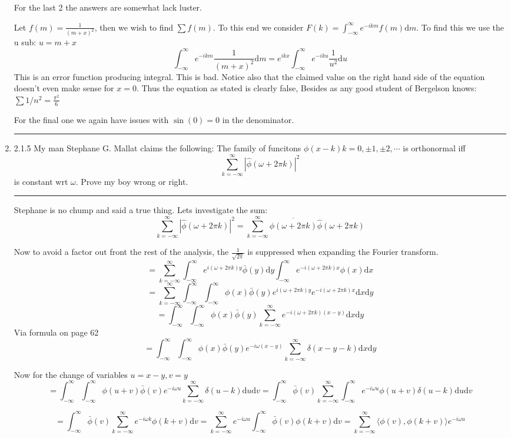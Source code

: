 \documentclass[12pt]{article}
\newcommand{\di}{\mathrm{d}}
\newcommand{\intinf}{\int_{-\infty}^\infty}
\newcommand{\suminf}[1]{\sum_{#1 = -\infty}^\infty}
\theoremstyle{definition}
\begin{document}
\begin{enumerate}
For the last 2 the answers are somewhat lack luster. 


Let $f(m) = \frac 1 { (m+x)^2} $, then we wish to find $\sum f(m)$. 
To this end we consider $F(k) = \intinf e^{-ikm} f(m) \di m$. To find this we use the u sub: $u = m+x$
\[
\intinf e^{-ikm} \frac 1 { (m+x)^2 }  \di m
=
e^{ikx} \intinf e^{-iku} \frac 1 { u^2 }  \di u
\]
This is an error function producing integral. This is bad.
Notice also that the claimed value on the right hand side of the equation doesn't even make sense for $x=0$.
Thus the equation as stated is clearly false, 
Besides as any good student of Bergelson knows: $\sum 1/n^2 = \frac {\pi^2} 6$



For the final one we again have issues with $\sin (0 ) = 0$
in the denominator.
\hrule


\item 2.1.5
My man Stephane G. Mallat claims the following:
The family of funcitons $\phi(x-k) k = 0 ,\pm 1, \pm 2, \cdots$ is orthonormal iff 
\[
\suminf{k} |\hat \phi ( \omega +2\pi k)|^2 
\]
is constant wrt $\omega$.
Prove my boy wrong or right.
\hrule
Stephane is no chump and said a true thing. 
Lets investigate the sum:
\[
\suminf{k} |\hat \phi ( \omega +2\pi k)|^2 
=
\suminf{k} \overline{\hat \phi ( \omega +2\pi k)}
\hat \phi ( \omega +2\pi k) 
\]

Now to avoid a factor out front the rest of the analysis, the $\frac 1 {\sqrt {2\pi}} $ is suppressed when expanding the Fourier transform.
\[
=
\suminf{k} 
\intinf e^{i (\omega+ 2\pi k)y}\bar \phi (y) \di y 
\intinf e^{-i (\omega+ 2\pi k)x} \phi (x) \di x 
\]
\[
=
\suminf{k} 
\intinf\intinf \phi (x)\bar \phi (y) e^{i (\omega+ 2\pi k)y}
 e^{-i (\omega+ 2\pi k)x}  \di x \di y 
\]
\[
=
\intinf\intinf \phi (x)\bar \phi (y) 
\suminf{k} 
 e^{-i (\omega + 2\pi k)(x-y)}  \di x \di y 
\]
Via formula on page 62
\[
=
\intinf\intinf \phi (x)\bar \phi (y) 
 e^{-i \omega(x-y)}  
\suminf{k} 
\delta(x-y-k)  \di x \di y 
\]

Now for the change of variables $u= x-y, v = y$
\[
=
\intinf\intinf \phi (u+v)\bar \phi (v) 
 e^{-i \omega u}  
\suminf{k} \delta(u-k)  \di u \di v 
=
\intinf\bar \phi (v) 
\suminf{k} \intinf e^{-i \omega u} \phi (u+v)\delta(u-k)  \di u \di v 
\]

\[
=
\intinf\bar \phi (v) 
\suminf{k}  e^{-i \omega k} \phi (k+v) \di v 
=
\suminf{k}
e^{-i \omega u}
\intinf\bar \phi (v) 
  \phi (k+v) \di v 
=
\suminf{k}
\langle \phi (v) ,
  \phi (k+v) \rangle 
  e^{-i \omega u}
\]


\end{enumerate}
\end{document}
